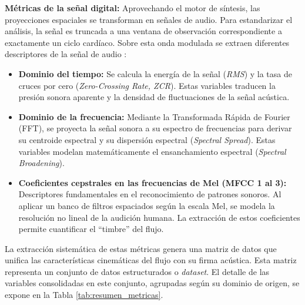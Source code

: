 \textbf{Métricas de la señal digital:} Aprovechando el motor de síntesis, las proyecciones espaciales se transforman en señales de audio. Para estandarizar el análisis, la señal es truncada a una ventana de observación correspondiente a exactamente un ciclo cardíaco. Sobre esta onda modulada se extraen diferentes descriptores de la señal de audio \cite{Davis1980,Tzanetakis2002}:
\begin{itemize}
    \item \textbf{Dominio del tiempo:} Se calcula la energía de la señal (\textit{RMS}) y la tasa de cruces por cero (\textit{Zero-Crossing Rate, ZCR}). Estas variables traducen la presión sonora aparente y la densidad de fluctuaciones de la señal acústica.
    
    \item \textbf{Dominio de la frecuencia:} Mediante la Transformada Rápida de Fourier (FFT), se proyecta la señal sonora a su espectro de frecuencias para derivar su centroide espectral y su dispersión espectral (\textit{Spectral Spread}). Estas variables modelan matemáticamente el ensanchamiento espectral (\textit{Spectral Broadening}).
    
    \item \textbf{Coeficientes cepstrales en las frecuencias de Mel (MFCC 1 al 3):} Descriptores fundamentales en el reconocimiento de patrones sonoros. Al aplicar un banco de filtros espaciados según la escala Mel, se modela la resolución no lineal de la audición humana. La extracción de estos coeficientes permite cuantificar el ``timbre'' del flujo.
\end{itemize}

La extracción sistemática de estas métricas genera una matriz de datos que unifica las características cinemáticas del flujo con su firma acústica. Esta matriz representa un conjunto de datos estructurados o \textit{dataset}. El detalle de las variables consolidadas en este conjunto, agrupadas según su dominio de origen, se expone en la Tabla \ref{tab:resumen_metricas}.

